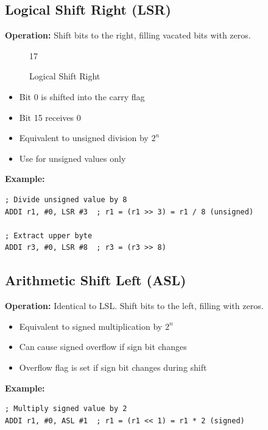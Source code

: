 \subsection{Logical Shift Right (LSR)}

\textbf{Operation:} Shift bits to the right, filling vacated bits with zeros.

\begin{figure}[H]
	\centering
	\begin{bytefield}[bitwidth=1.2em]{17}
		 \\
	\end{bytefield}
	\caption{Logical Shift Right}
\end{figure}

\begin{itemize}
	\item Bit 0 is shifted into the carry flag
	\item Bit 15 receives 0
	\item Equivalent to unsigned division by $2^n$
	\item Use for unsigned values only
\end{itemize}

\textbf{Example:}
\begin{lstlisting}
; Divide unsigned value by 8
ADDI r1, #0, LSR #3  ; r1 = (r1 >> 3) = r1 / 8 (unsigned)

; Extract upper byte
ADDI r3, #0, LSR #8  ; r3 = (r3 >> 8)
\end{lstlisting}

\subsection{Arithmetic Shift Left (ASL)}

\textbf{Operation:} Identical to LSL. Shift bits to the left, filling with zeros.

\begin{itemize}
	\item Equivalent to signed multiplication by $2^n$
	\item Can cause signed overflow if sign bit changes
	\item Overflow flag is set if sign bit changes during shift
\end{itemize}

\textbf{Example:}
\begin{lstlisting}
; Multiply signed value by 2
ADDI r1, #0, ASL #1  ; r1 = (r1 << 1) = r1 * 2 (signed)
\end{lstlisting}

